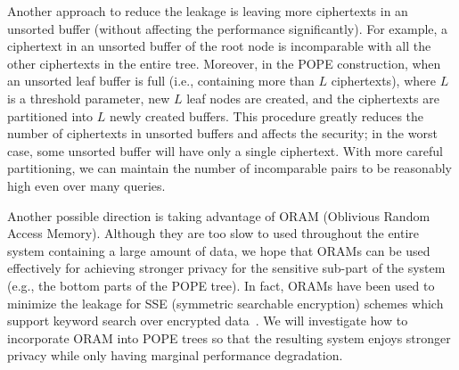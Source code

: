 

Another approach to reduce the leakage is leaving more ciphertexts in an
unsorted buffer (without affecting the performance significantly). For example,
a ciphertext in an unsorted buffer of the root node is incomparable with all
the other ciphertexts in the entire tree.  Moreover, in the POPE construction,
when an unsorted leaf buffer is full (i.e.,  containing more than $L$
ciphertexts), where $L$ is a threshold parameter, new $L$ leaf nodes are
created, and the ciphertexts are partitioned into $L$ newly created buffers.
This procedure greatly reduces the number of ciphertexts in unsorted buffers
and affects the security; in the worst case, some unsorted buffer will have
only a single ciphertext. With more careful partitioning, we can maintain the
number of incomparable pairs to be reasonably high even over many queries. 


Another possible direction is taking advantage of ORAM (Oblivious Random Access
Memory). Although they are too slow to used throughout the entire system
containing a large amount of data, we hope that ORAMs can be used effectively
for achieving stronger privacy for the sensitive sub-part of the system (e.g.,
the bottom parts of the POPE tree).  In fact, ORAMs have been used to minimize
the leakage for SSE (symmetric searchable encryption) schemes which support
keyword search over encrypted
data~\cite{NDSS:StePapShi14,C:GarMohPap16,RSA:IKLO16}. We will investigate how
to incorporate ORAM into POPE trees so that the resulting system enjoys
stronger privacy while only having marginal performance degradation.  



